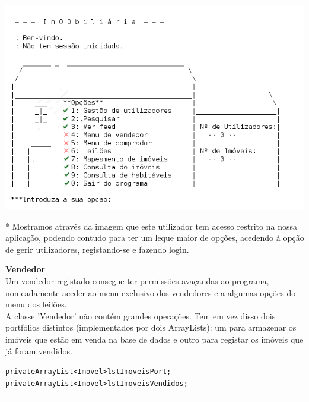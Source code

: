 \documentclass[12pt]{article}
\newenvironment{code}                    
{\textbf{
} \hspace{1cm} \hrulefill \\ 
\smallskip 
\begin{center}
\begin{minipage}{0.9\textwidth} 
\begin{alltt}\small}
{\end{alltt}
\end{minipage}
\end{center}
\hrule\smallskip
}
\begin{document}
\includegraphics[scale=0.5]{007.png}	
\\
\begin{footnotesize}
* Mostramos através da imagem que este utilizador tem acesso restrito na nossa aplicação, podendo contudo para ter um leque maior de opções, acedendo à opção de gerir utilizadores, registando-se e fazendo login.
\end{footnotesize}
\pagebreak

\textbf{Vendedor}
~\\

Um vendedor registado consegue ter permissões avaçandas ao programa, nomeadamente aceder ao menu exclusivo dos vendedores e a algumas opções do menu dos leilões. \\

A classe 'Vendedor' não contém grandes operações. Tem em vez disso dois portfólios distintos (implementados por dois ArrayLists): um para armazenar os imóveis que estão em venda na base de dados e outro para registar os imóveis que já foram vendidos.
\begin{code}
private ArrayList<Imovel> lstImoveisPort;
private ArrayList<Imovel> lstImoveisVendidos;
\end{code}

~\\
\end{document}
